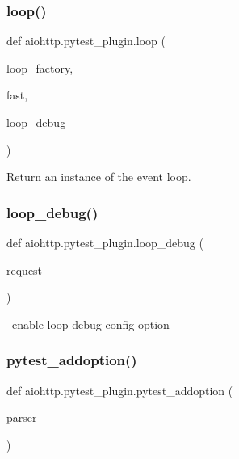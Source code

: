 \subsubsection{\texorpdfstring{loop()}{loop()}}
{\footnotesize\ttfamily def aiohttp.\+pytest\+\_\+plugin.\+loop (\begin{DoxyParamCaption}\item[{}]{loop\+\_\+factory,  }\item[{}]{fast,  }\item[{}]{loop\+\_\+debug }\end{DoxyParamCaption})}

\begin{DoxyVerb}Return an instance of the event loop.\end{DoxyVerb}
 \mbox{\label{namespaceaiohttp_1_1pytest__plugin_a557e64d4b425eaca246cb556d5704850}} 
\subsubsection{\texorpdfstring{loop\+\_\+debug()}{loop\_debug()}}
{\footnotesize\ttfamily def aiohttp.\+pytest\+\_\+plugin.\+loop\+\_\+debug (\begin{DoxyParamCaption}\item[{}]{request }\end{DoxyParamCaption})}

\begin{DoxyVerb}--enable-loop-debug config option\end{DoxyVerb}
 \mbox{\label{namespaceaiohttp_1_1pytest__plugin_ac0f752130583c16f198a79d395bc50f9}} 
\subsubsection{\texorpdfstring{pytest\+\_\+addoption()}{pytest\_addoption()}}
{\footnotesize\ttfamily def aiohttp.\+pytest\+\_\+plugin.\+pytest\+\_\+addoption (\begin{DoxyParamCaption}\item[{}]{parser }\end{DoxyParamCaption})}


